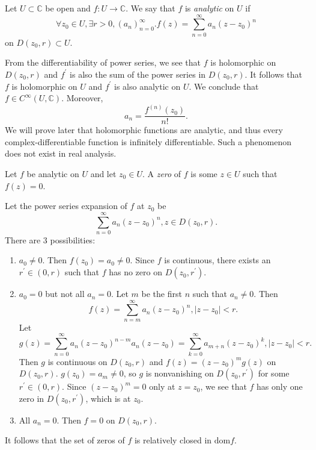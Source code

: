 \begin{defn}
  Let $U \subset \mathbb{C}$ be open and $f : U \to \mathbb{C}$.
  We say that $f$ is \emph{analytic} on $U$ if
  $$
  \forall z_0 \in U, \exists r > 0, (a_n)_{n=0}^\infty .
  f(z) = \sum_{n=0}^\infty a_n (z - z_0)^n
  $$
  on $D(z_0, r) \subset U$.
\end{defn}

From the differentiability of power
series, we see that $f$ is holomorphic on $D(z_0, r)$ and
$f^\prime$ is also the sum of the power series in $D(z_0, r)$.
It follows that $f$ is holomorphic on $U$ and $f^\prime$ is also
analytic on $U$. We conclude that
$f \in C^\infty(U, \mathbb{C})$. Moreover,
$$
a_n = \frac{f^{(n)}(z_0)}{n!}.
$$
We will prove later that holomorphic functions are analytic,
and thus every complex-differentiable function is infinitely
differentiable. Such a phenomenon does not exist in real analysis.

\begin{defn}
Let $f$ be analytic on $U$ and let $z_0 \in U$. A
\emph{zero} of $f$ is some $z \in U$ such that $f(z) = 0$.
\end{defn}

Let the power series expansion of $f$ at $z_0$ be
$$
\sum_{n=0}^\infty a_n (z - z_0)^n, z \in D(z_0, r).
$$
There are 3 possibilities:
\begin{enumerate}
  \item{
    $a_0 \neq 0$. Then $f(z_0) = a_0 \neq 0$. Since $f$ is
    continuous, there exists an $r^\prime \in (0, r)$ such that
    $f$ has no zero on $D(z_0, r^\prime)$.
  }
  \item{
    $a_0 = 0$ but not all $a_n = 0$. Let $m$ be the first
    $n$ such that $a_n \neq 0$. Then
    $$
    f(z) = \sum_{n=m}^\infty a_n (z - z_0)^n, |z - z_0| < r.
    $$
    Let
    $$
    g(z) = \sum_{n=0}^\infty a_n (z - z_0)^{n - m} a_n (z - z_0)
         = \sum_{k=0}^\infty a_{m+n} (z - z_0)^k, |z - z_0| < r.
    $$
    Then $g$ is continuous on $D(z_0, r)$ and
    $f(z) = (z - z_0)^m g(z)$ on $D(z_0, r)$.
    $g(z_0) = a_m \neq 0$, so $g$ is nonvanishing on $D(z_0, r^\prime)$
    for some $r^\prime \in (0, r)$. Since $(z - z_0)^m = 0$ only at
    $z = z_0$, we see that $f$ has only one zero in
    $D(z_0, r^\prime)$, which is at $z_0$.
  }
  \item{
    All $a_n = 0$. Then $f = 0$ on $D(z_0, r)$.
  }
\end{enumerate}
It follows that the set of zeros of $f$ is relatively closed in
$\mathrm{dom} f$.

